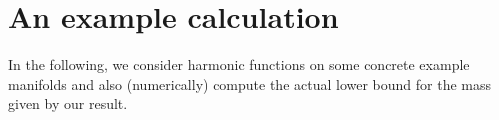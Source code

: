\documentclass[titlepage,numbers=noenddot,oneside,%
cleardoublepage=empty,paper=a4,fontsize=11pt,%
english,%
]{scrartcl}
\begin{document}





\section{An example calculation}\label{sec:example}
In the following, we consider harmonic functions on some concrete example manifolds and also (numerically) compute the actual lower bound for the mass given by our result. 
\end{document}
